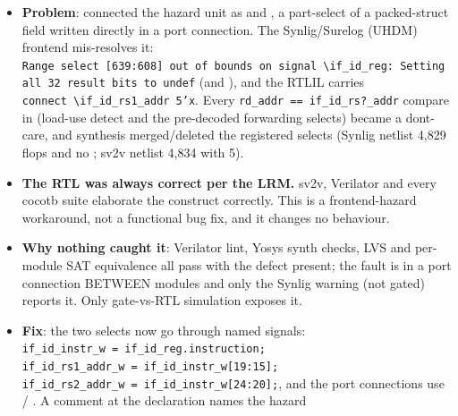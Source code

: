 \begin{record}

\begin{itemize}
\tightlist
\item
  \textbf{Problem}:  connected the hazard unit as
   and
  , a part-select of
  a packed-struct field written directly in a port connection. The
  Synlig/\allowbreak{}Surelog (UHDM) frontend mis-resolves it:
  \texttt{Range\ select\ [639:\allowbreak{}608]\ out\ of\ bounds\ on\ signal\ \textbackslash{}if\_\allowbreak{}id\_\allowbreak{}reg:\allowbreak{}\ Setting\ all\ 32\ result\ bits\ to\ undef}
  (and \code{[799:768]}), and the RTLIL carries
  \texttt{connect\ \textbackslash{}if\_\allowbreak{}id\_\allowbreak{}rs1\_\allowbreak{}addr\ 5'x}.
  Every
  \texttt{rd\_\allowbreak{}addr\ =\allowbreak{}=\allowbreak{}\ if\_\allowbreak{}id\_\allowbreak{}rs?\_\allowbreak{}addr}
  compare in  (load-use detect and the
  pre-decoded forwarding selects) became a don\textquotesingle t-care,
  and synthesis merged/\allowbreak{}deleted the 
  registered selects (Synlig netlist 4,829 flops and no ;
  sv2v netlist 4,834 with 5).
\item
  \textbf{The RTL was always correct per the LRM.} sv2v, Verilator and
  every cocotb suite elaborate the construct correctly. This is a
  frontend-hazard workaround, not a functional bug fix, and it changes
  no behaviour.
\item
  \textbf{Why nothing caught it}: Verilator lint, Yosys synth checks,
  LVS and per-module SAT equivalence all pass with the defect present;
  the fault is in a port connection BETWEEN modules and only the Synlig
  warning (not gated) reports it. Only gate-vs-RTL simulation exposes
  it.
\item
  \textbf{Fix}: the two selects now go through named signals:
  \texttt{if\_\allowbreak{}id\_\allowbreak{}instr\_\allowbreak{}w\ =\allowbreak{}\ if\_\allowbreak{}id\_\allowbreak{}reg.\allowbreak{}instruction;}
  \texttt{if\_\allowbreak{}id\_\allowbreak{}rs1\_\allowbreak{}addr\_\allowbreak{}w\ =\allowbreak{}\ if\_\allowbreak{}id\_\allowbreak{}instr\_\allowbreak{}w[19:\allowbreak{}15];}
  \texttt{if\_\allowbreak{}id\_\allowbreak{}rs2\_\allowbreak{}addr\_\allowbreak{}w\ =\allowbreak{}\ if\_\allowbreak{}id\_\allowbreak{}instr\_\allowbreak{}w[24:\allowbreak{}20];},
  and the port connections use  /
  . A comment at the declaration names the hazard

\end{itemize}
\end{record}
